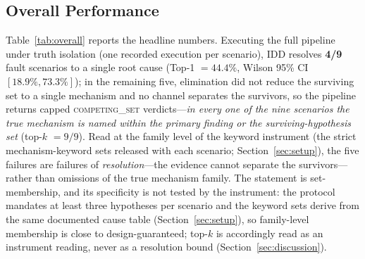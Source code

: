 \documentclass[preprint,12pt]{elsarticle}
\begin{document}
\subsection{Overall Performance}
\label{sec:overall}
Table~\ref{tab:overall} reports the headline numbers. Executing the full pipeline under truth isolation (one recorded execution per scenario), IDD resolves \textbf{4/9} fault scenarios to a single root cause (Top-1 $=44.4\%$, Wilson 95\% CI $[18.9\%,73.3\%]$); in the remaining five, elimination did not reduce the surviving set to a single mechanism and no channel separates the survivors, so the pipeline returns capped \mbox{\textsc{competing\_set}} verdicts---\emph{in every one of the nine scenarios the true mechanism is named within the primary finding or the surviving-hypothesis set} (top-$k$ $=9/9$). Read at the family level of the keyword instrument (the strict mechanism-keyword sets released with each scenario; Section~\ref{sec:setup}), the five failures are failures of \emph{resolution}---the evidence cannot separate the survivors---rather than omissions of the true mechanism family. The statement is set-membership, and its specificity is not tested by the instrument: the protocol mandates at least three hypotheses per scenario and the keyword sets derive from the same documented cause table (Section~\ref{sec:setup}), so family-level membership is close to design-guaranteed; top-$k$ is accordingly read as an instrument reading, never as a resolution bound (Section~\ref{sec:discussion}).
\end{document}
